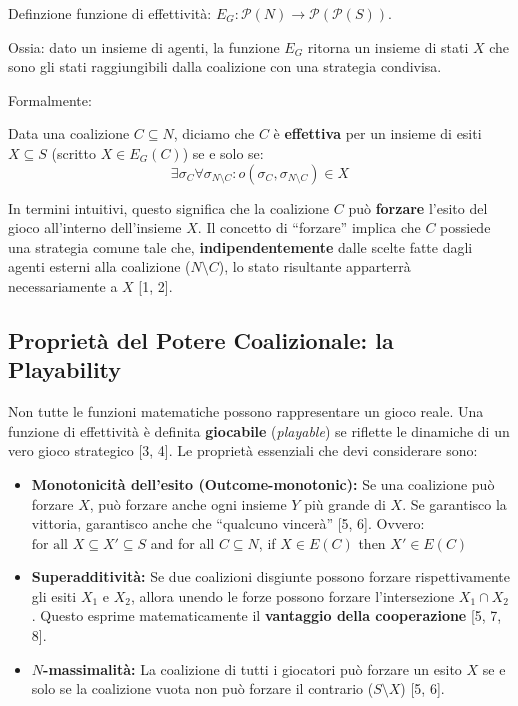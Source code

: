 \documentclass[12pt]{article}
\begin{document}
Definzione funzione di effettività: $E_G : \mathcal{P}(N) \rightarrow \mathcal{P}(\mathcal{P}(S))$.

Ossia: dato un insieme di agenti, la funzione $E_G$ ritorna un insieme di stati $X$ che sono gli stati
raggiungibili dalla coalizione con una strategia condivisa.

Formalmente:

Data una coalizione $C \subseteq N$, diciamo che $C$ è \textbf{effettiva} per un
insieme di esiti $X \subseteq S$ (scritto $X \in E_G(C)$) se e solo se:
\begin{equation}
	\exists \sigma_C \forall \sigma_{N \setminus C} : o(\sigma_C, \sigma_{N \setminus C}) \in X
\end{equation}

In termini intuitivi, questo significa che la coalizione $C$ può \textbf{forzare}
l'esito del gioco all'interno dell'insieme $X$. Il concetto di ``forzare'' implica
che $C$ possiede una strategia comune tale che, \textbf{indipendentemente} dalle
scelte fatte dagli agenti esterni alla coalizione ($N \setminus C$), lo stato
risultante apparterrà necessariamente a $X$ [1, 2].

\subsection{Proprietà del Potere Coalizionale: la Playability}

Non tutte le funzioni matematiche possono rappresentare un gioco reale. Una
funzione di effettività è definita \textbf{giocabile} (\textit{playable}) se
riflette le dinamiche di un vero gioco strategico [3, 4]. Le proprietà
essenziali che devi considerare sono:

\begin{itemize}
	\item \textbf{Monotonicità dell'esito (Outcome-monotonic):} Se una coalizione può forzare $X$,
	      può forzare anche ogni insieme $Y$ più grande di $X$. Se garantisco la
	      vittoria, garantisco anche che ``qualcuno vincerà'' [5, 6]. Ovvero: $ \text{for all } X \subseteq X' \subseteq S $ and for all $ C \subseteq N $, if $X \in E(C)$ then $X' \in E(C)$
	\item \textbf{Superadditività:} Se due coalizioni disgiunte possono forzare
	      rispettivamente gli esiti $X_1$ e $X_2$, allora unendo le forze possono
	      forzare l'intersezione $X_1 \cap X_2$. Questo esprime matematicamente il
	      \textbf{vantaggio della cooperazione} [5, 7, 8].
	\item \textbf{$N$-massimalità:} La coalizione di tutti i giocatori può
	      forzare un esito $X$ se e solo se la coalizione vuota non può forzare il
	      contrario ($S \setminus X$) [5, 6].
\end{itemize}
\end{document}
